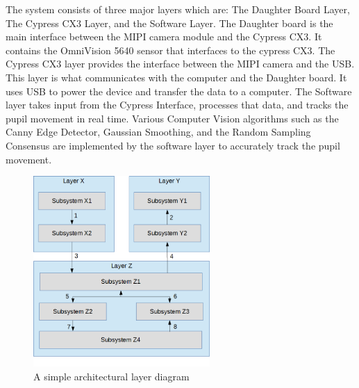 The system consists of three major layers which are: The Daughter Board Layer, The Cypress CX3 Layer, and the Software Layer. The Daughter board is the main interface between the MIPI camera module and the Cypress CX3. It contains the OmniVision 5640 sensor that interfaces to the cypress CX3.
The Cypress CX3 layer provides the interface between the MIPI camera and the USB. This layer is what communicates with the computer and the Daughter board. It uses USB to power the device and transfer the data to a computer. 
The Software layer takes input from the Cypress Interface, processes that data, and tracks the pupil movement in real time. Various Computer Vision algorithms such as the Canny Edge Detector, Gaussian Smoothing, and the Random Sampling Consensus are implemented by the software layer to accurately track the pupil movement.



\begin{figure}[h!]
	\centering
 	\includegraphics[width=0.60\textwidth]{images/data_flow}
 \caption{A simple architectural layer diagram}
\end{figure}


